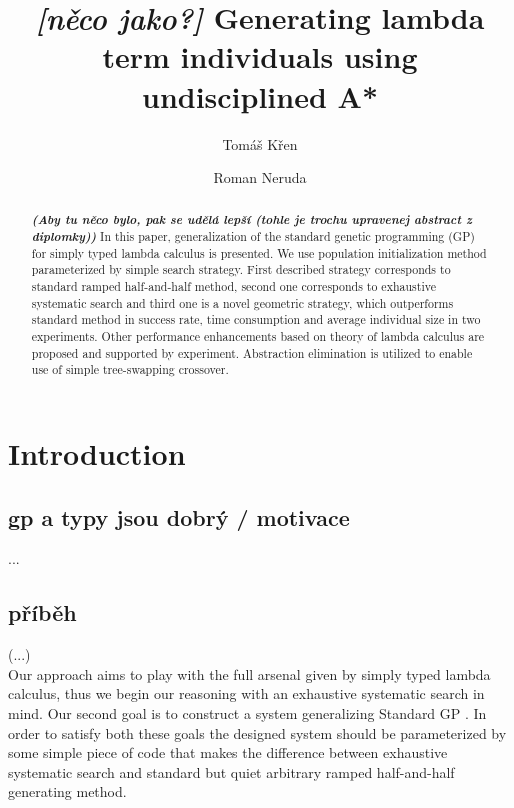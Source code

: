 \documentclass{llncs}
\begin{document}
\title{\textit{[něco jako?]} 
Generating lambda term individuals using undisciplined A*}
\author{Tom\'{a}\v{s} K\v{r}en \and Roman Neruda}
\maketitle

\begin{abstract}
\textbf{\textit{
(Aby tu něco bylo, pak se udělá lepší 
(tohle je trochu upravenej abstract z diplomky))}}
In this paper, generalization of the standard genetic programming (GP)
for simply typed lambda calculus is presented. We use population 
initialization method parameterized by simple search strategy. 
First described strategy corresponds to standard ramped half-and-half method, 
second one corresponds to exhaustive systematic search and third one is a 
novel geometric strategy, which outperforms standard method in success 
rate, time consumption and average individual size in two experiments. 
Other performance enhancements based on theory of lambda calculus are 
proposed and supported by experiment. Abstraction elimination is 
utilized to enable use of simple tree-swapping crossover.
\end{abstract}


\section{Introduction}

\subsection{gp a typy jsou dobrý / motivace}
...
\subsection{příběh}

(...)\\

Our approach aims to play with the full arsenal given by simply typed lambda calculus, thus we begin our reasoning with an exhaustive systematic search
in mind. Our second goal is to construct a system generalizing Standard 
GP \cite{koza92}.
In order to satisfy both these goals the designed system should be 
parameterized by some simple piece of code that makes the difference
between exhaustive systematic search and standard but 
quiet arbitrary ramped half-and-half generating method. 
\end{document}
